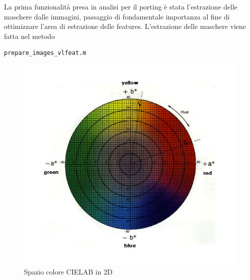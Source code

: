 \documentclass[a4paper,12pt]{report}
\begin{document}
      La prima funzionalità presa in analisi per il porting è stata l'estrazione delle maschere dalle immagini,
      passaggio di fondamentale importanza al fine di ottimizzare l'area di estrazione delle features. L'estrazione delle maschere viene fatta
      nel metodo 
      \begin{verbatim}
prepare_images_vlfeat.m
      \end{verbatim}
      \begin{figure}
        \centering
        
        \begin{minipage}{0.35\textwidth}
          \centering
          \includegraphics[width=\textwidth]{assets/images/methods/porting/cielab/cielab2.jpg}  
          \caption{Spazio colore CIELAB in 2D}
        \end{minipage}
        \begin{minipage}{0.35\textwidth}
          \centering

\end{minipage}
\end{figure}
\end{document}
